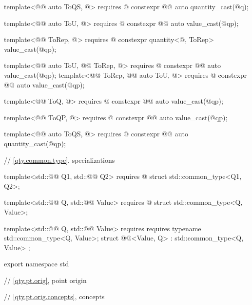 \begin{codeblock}
{template<@@ auto ToQS, @\seebelownc@>
  requires @\seebelownc@
constexpr @@ auto quantity_cast(@\seebelownc@ q);

template<@@ auto ToU, @\seebelownc@>
  requires @\seebelownc@
constexpr @@ auto value_cast(@\seebelownc@ qp);

template<@@ ToRep, @\seebelownc@>
  requires @\seebelownc@
constexpr quantity<@\seebelownc@, ToRep> value_cast(@\seebelownc@ qp);

template<@@ auto ToU, @@ ToRep, @\seebelownc@>
  requires @\seebelownc@
constexpr @@ auto value_cast(@\seebelownc@ qp);
template<@@ ToRep, @@ auto ToU, @\seebelownc@>
  requires @\seebelownc@
constexpr @@ auto value_cast(@\seebelownc@ qp);

template<@@ ToQ, @\seebelownc@>
  requires @\seebelownc@
constexpr @@ auto value_cast(@\seebelownc@ qp);

template<@@ ToQP, @\seebelownc@>
  requires @\seebelownc@
constexpr @@ auto value_cast(@\seebelownc@ qp);

template<@@ auto ToQS, @\seebelownc@>
  requires @\seebelownc@
constexpr @@ auto quantity_cast(@\seebelownc@ qp);

}

// \ref{qty.common.type},  specializations

template<std::@@ Q1, std::@@ Q2>
  requires @\seebelownc@
struct std::common_type<Q1, Q2>;

template<std::@@ Q, std::@@ Value>
  requires @\seebelownc@
struct std::common_type<Q, Value>;

template<std::@@ Q, std::@@ Value>
  requires requires { typename std::common_type<Q, Value>; }
struct @@<Value, Q> : std::common_type<Q, Value> {};

export namespace std {

// \ref{qty.pt.orig}, point origin

// \ref{qty.pt.orig.concepts}, concepts

}
\end{codeblock}
